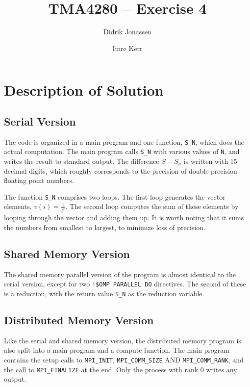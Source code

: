 \documentclass[a4paper, 12pt]{article}
\title{TMA4280 -- Exercise 4}
\author{Didrik Jonassen \and Imre Kerr}
\begin{document}
\maketitle

\section{Description of Solution} %
\label{sec:description_of_solution}
    \subsection{Serial Version} %
        The code is organized in a main program and one function, \texttt{S\_N}, which does the actual computation. The main program calls \texttt{S\_N} with various values of \texttt{N}, and writes the result to standard output. The difference $S-S_n$ is written with 15 decimal digits, which roughly corresponds to the precision of double-precision floating point numbers.

        The function \texttt{S\_N} comprises two loops. The first loop generates the vector elements, $v(i) = \frac{1}{i^2}$. The second loop computes the sum of these elements by looping through the vector and adding them up. It is worth noting that it sums the numbers from smallest to largest, to minimize loss of precision.

    \subsection{Shared Memory Version} %
        The shared memory parallel version of the program is almost identical to the serial version, except for two \texttt{!\$OMP PARALLEL DO} directives. The second of these is a reduction, with the return value \texttt{S\_N} as the reduction variable.

    \subsection{Distributed Memory Version} %
        Like the serial and shared memory version, the distributed memory program is also split into a main program and a compute function. The main program contains the setup calls to \texttt{MPI\_INIT}, \texttt{MPI\_COMM\_SIZE} AND \texttt{MPI\_COMM\_RANK}, and the call to \texttt{MPI\_FINALIZE} at the end. Only the process with rank 0 writes any output.
\end{document}
